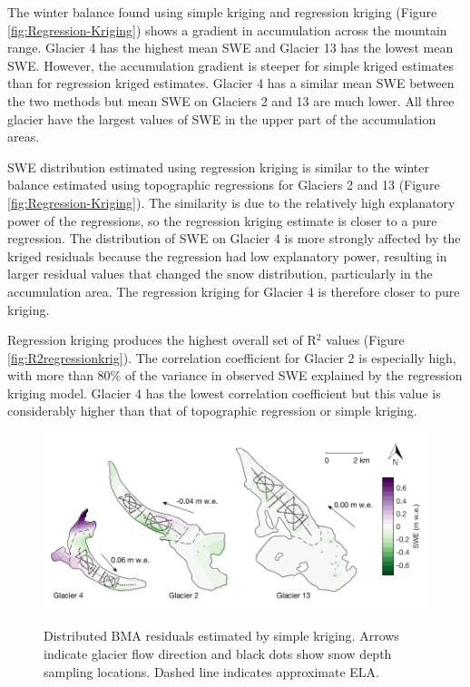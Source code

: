 \documentclass{sfuthesis}
\newcommand{\topomap}{Arrows indicate glacier flow direction and black dots show snow depth sampling locations. }
\begin{document}
The winter balance found using simple kriging and regression kriging (Figure \ref{fig:Regression-Kriging}) shows a gradient in accumulation across the mountain range. Glacier 4 has the highest mean SWE and Glacier 13 has the lowest mean SWE. However, the accumulation gradient is steeper for simple kriged estimates than for regression kriged estimates. Glacier 4 has a similar mean SWE between the two methods but mean SWE on Glaciers 2 and 13 are much lower. All three glacier have the largest values of SWE in the upper part of the accumulation areas. 

SWE distribution estimated using regression kriging is similar to the winter balance estimated using topographic regressions for Glaciers 2 and 13 (Figure \ref{fig:Regression-Kriging}). The similarity is due to the relatively high explanatory power of the regressions, so the regression kriging estimate is closer to a pure regression. The distribution of SWE on Glacier 4 is more strongly affected by the kriged residuals because the regression had low explanatory power, resulting in larger residual values that changed the snow distribution, particularly in the accumulation area. The regression kriging for Glacier 4 is therefore closer to pure kriging.

Regression kriging produces the highest overall set of R$^2$ values (Figure \ref{fig:R2regressionkrig}). The correlation coefficient for Glacier 2 is especially high, with more than 80\% of the variance in observed SWE explained by the regression kriging model. Glacier 4 has the lowest correlation coefficient but this value is considerably higher than that of topographic regression or simple kriging. 

\begin{figure}[H]
	\centering
	\includegraphics[width = \textwidth]{residualsKriged.png}\\
	\caption{Distributed BMA residuals estimated by simple kriging.  \topomap Dashed line indicates approximate ELA.}
	\label{fig:residualsKRIGING}
\end{figure}
\end{document}
